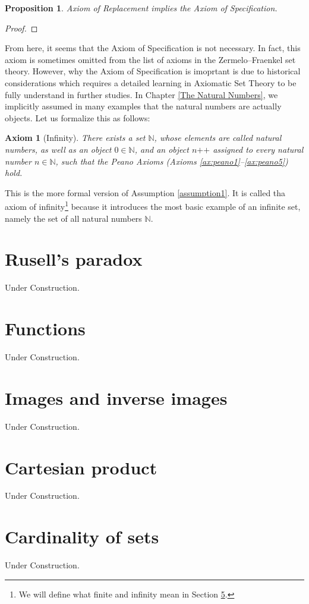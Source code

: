 \documentclass[a4paper]{book}
\newtheorem*{proof}{\textit{Proof.}}
\newtheorem{axiom}{Axiom}[chapter]
\newtheorem{proposition}{Proposition}[section]
\begin{document}
			\begin{proposition}
				Axiom of Replacement implies the Axiom of Specification.
			\end{proposition}
			\begin{proof}
				
			\end{proof}
			From here, it seems that the Axiom of Specification is not necessary. In fact, this axiom is sometimes omitted from the list of axioms in the Zermelo–Fraenkel set theory. However, why the Axiom of Specification is imoprtant is due to historical considerations which requires a detailed learning in Axiomatic Set Theory to be fully understand in further studies.
			In Chapter \ref{The Natural Numbers}, we implicitly assumed in many examples that the natural numbers are actually objects. Let us formalize this as follows:
			\begin{axiom}[Infinity]
				There exists a set $\mathbb{N}$, whose elements are called natural numbers, as well as an object $0\in\mathbb{N}$, and an object $n\texttt{++}$ assigned to every natural number $n\in\mathbb{N}$, such that the Peano Axioms (Axioms \ref{ax:peano1}--\ref{ax:peano5}) hold.
			\end{axiom}
			This is the more formal version of Assumption \ref{assumption1}. It is called tha axiom of infinity\footnote{We will define what finite and infinity mean in Section \ref{Cardinality of sets}.} because it introduces the most basic example of an infinite set, namely the set of all natural numbers $\mathbb{N}$.
		\section{Rusell's paradox}
			Under Construction.
		\section{Functions}
			Under Construction.
		\section{Images and inverse images}
			Under Construction.
		\section{Cartesian product}
			Under Construction.
		\section{Cardinality of sets}
			\label{Cardinality of sets}
			Under Construction.
\end{document}
